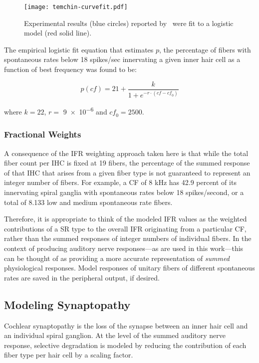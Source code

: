 \begin{figure}[htbp]
	\centering
	\texttt{[image: temchin-curvefit.pdf]}
	\caption[Variation in Spontaneous Rate as a Function of Frequency]{Experimental results (blue circles) reported by~\cite{Temchin2008Threshold} were fit to a logistic model (red solid line).}
	\label{fig:temchin-curvefit}
\end{figure}

The empirical logistic fit equation that estimates $p$, the percentage of fibers with spontaneous rates below 18 spikes/sec innervating a given inner hair cell as a function of best frequency was found to be: 

\begin{equation}
	p(\mathit{cf}) = 21 + \frac{k}{1+e^{-r\cdot(\mathit{cf}-\mathit{cf}_0)}}
\end{equation}

where $k = 22$, $r = $ \num{9e-6} and $\mathit{cf}_0 = 2500$.

\subsubsection{Fractional Weights}
A consequence of the IFR weighting approach taken here is that while the total fiber count per IHC is fixed at 19 fibers, the percentage of the summed response of that IHC that arises from a given fiber type is not guaranteed to represent an integer number of fibers.  For example, a CF of 8 kHz has 42.9 percent of its innervating spiral ganglia with spontaneous rates below 18 spikes/second, or a total of 8.133 low and medium spontaneous rate fibers.  

Therefore, it is appropriate to think of the modeled IFR values as the weighted contributions of a SR type to the overall IFR originating from a particular CF, rather than the summed responses of integer numbers of individual fibers.  In the context of producing auditory nerve responses---as are used in this work---this can be thought of as providing a more accurate representation of \emph{summed} physiological responses. Model responses of unitary fibers of different spontaneous rates are saved in the peripheral output, if desired.

\subsection{Modeling Synaptopathy} %
\label{sub:modeling_synaptopathy}
Cochlear synaptopathy is the loss of the synapse between an inner hair cell and an individual spiral ganglion.  At the level of the summed auditory nerve response, selective degradation is modeled by reducing the contribution of each fiber type per hair cell by a scaling factor. 

